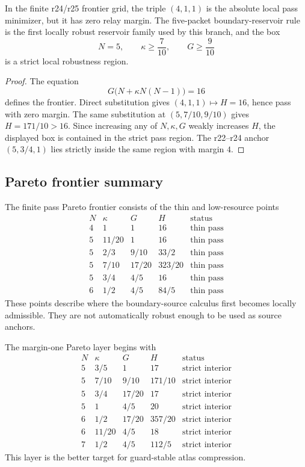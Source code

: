 \begin{proposition}
\label{prop:v470-r25-frontier-minimizer-decision}
In the finite r24/r25 frontier grid, the triple \((4,1,1)\) is the absolute
local pass minimizer, but it has zero relay margin.  The five-packet
boundary-reservoir rule is the first locally robust reservoir family used by
this branch, and the box
\[
N=5,
\qquad
\kappa\geq\frac7{10},
\qquad
G\geq\frac9{10}
\]
is a strict local robustness region.
\end{proposition}

\begin{proof}
The equation
\[
G\bigl(N+\kappa N(N-1)\bigr)=16
\]
defines the frontier.  Direct substitution gives
\((4,1,1)\mapsto H=16\), hence pass with zero margin.  The same substitution at
\((5,7/10,9/10)\) gives \(H=171/10>16\).  Since increasing any of
\(N,\kappa,G\) weakly increases \(H\), the displayed box is contained in the
strict pass region.  The r22--r24 anchor \((5,3/4,1)\) lies strictly inside the
same region with margin \(4\).
\end{proof}

\subsection{Pareto frontier summary}
\label{subsec:v470-r25-pareto-frontier-summary}

The finite pass Pareto frontier consists of the thin and low-resource points
\[
\begin{array}{c|c|c|c|c}
N & \kappa & G & H & \text{status}\\
\hline
4 & 1 & 1 & 16 & \text{thin pass}\\
5 & 11/20 & 1 & 16 & \text{thin pass}\\
5 & 2/3 & 9/10 & 33/2 & \text{thin pass}\\
5 & 7/10 & 17/20 & 323/20 & \text{thin pass}\\
5 & 3/4 & 4/5 & 16 & \text{thin pass}\\
6 & 1/2 & 4/5 & 84/5 & \text{thin pass}
\end{array}
\]
These points describe where the boundary-source calculus first becomes locally
admissible.  They are not automatically robust enough to be used as source
anchors.

The margin-one Pareto layer begins with
\[
\begin{array}{c|c|c|c|c}
N & \kappa & G & H & \text{status}\\
\hline
5 & 3/5 & 1 & 17 & \text{strict interior}\\
5 & 7/10 & 9/10 & 171/10 & \text{strict interior}\\
5 & 3/4 & 17/20 & 17 & \text{strict interior}\\
5 & 1 & 4/5 & 20 & \text{strict interior}\\
6 & 1/2 & 17/20 & 357/20 & \text{strict interior}\\
6 & 11/20 & 4/5 & 18 & \text{strict interior}\\
7 & 1/2 & 4/5 & 112/5 & \text{strict interior}
\end{array}
\]
This layer is the better target for guard-stable atlas compression.

